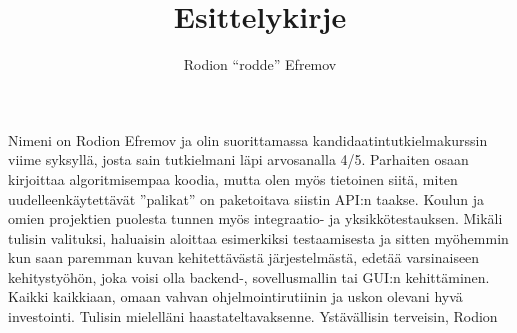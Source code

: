 \documentclass[10pt]{article}
\title{Esittelykirje}
\author{Rodion ``rodde'' Efremov}
\begin{document}
 \maketitle

Nimeni on Rodion Efremov ja olin suorittamassa kandidaatintutkielmakurssin viime syksyllä, josta sain tutkielmani läpi arvosanalla 4/5. Parhaiten osaan kirjoittaa algoritmisempaa koodia, mutta olen myös tietoinen siitä, miten uudelleenkäytettävät ''palikat'' on paketoitava siistin API:n taakse. Koulun ja omien projektien puolesta tunnen myös integraatio- ja yksikkötestauksen. Mikäli tulisin valituksi, haluaisin aloittaa esimerkiksi testaamisesta ja sitten myöhemmin kun saan paremman kuvan kehitettävästä järjestelmästä, edetää varsinaiseen kehitystyöhön, joka voisi olla backend-, sovellusmallin tai GUI:n kehittäminen. Kaikki kaikkiaan, omaan vahvan ohjelmointirutiinin ja uskon olevani hyvä investointi. Tulisin mielelläni haastateltavaksenne.
\newline \break
Ystävällisin terveisin, Rodion
\end{document}

